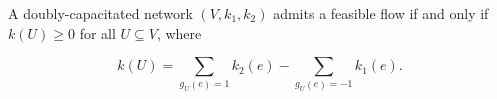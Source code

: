 A doubly-capacitated network $(V, k_1, k_2)$ admits a feasible flow if and only if $k(U) \geq 0$ for all $U \subseteq V$, where

$$k(U) = \sum_{g_U(e)=1} k_2(e) - \sum_{g_U(e)=-1} k_1(e).$$
